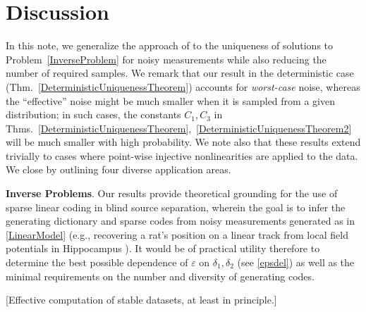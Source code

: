 \documentclass[9pt,twocolumn]{pnas-new}
\begin{document}
\section{Discussion}\label{Discussion}

In this note, we generalize the approach of \cite{Hillar15} to the uniqueness of solutions to Problem~\ref{InverseProblem} for noisy measurements while also reducing the number of required samples.
We remark that our result in the deterministic case (Thm.~\ref{DeterministicUniquenessTheorem}) accounts for \emph{worst-case} noise, whereas the ``effective'' noise might be much smaller when it is sampled from a given distribution; in such cases, the constants $C_1, C_3$ in Thms.~\ref{DeterministicUniquenessTheorem},~\ref{DeterministicUniquenessTheorem2} will be much smaller with high probability.
We note also that these results extend trivially to cases where point-wise injective nonlinearities are applied to the data. We close by outlining four diverse application areas.

\textbf{Inverse Problems}.  
Our results provide theoretical grounding for the use of sparse linear coding in blind source separation, wherein the goal is to infer the generating dictionary and sparse codes from noisy measurements generated as in \eqref{LinearModel} (e.g., recovering a rat's position on a linear track from local field potentials in Hippocampus \cite{Agarwal14}). It would be of practical utility therefore to determine the best possible dependence of $\varepsilon$ on $\delta_1, \delta_2$ (see \eqref{epsdel}) as well as the minimal requirements on the number and diversity of generating codes. %

[Effective computation of stable datasets, at least in principle.]
\end{document}
